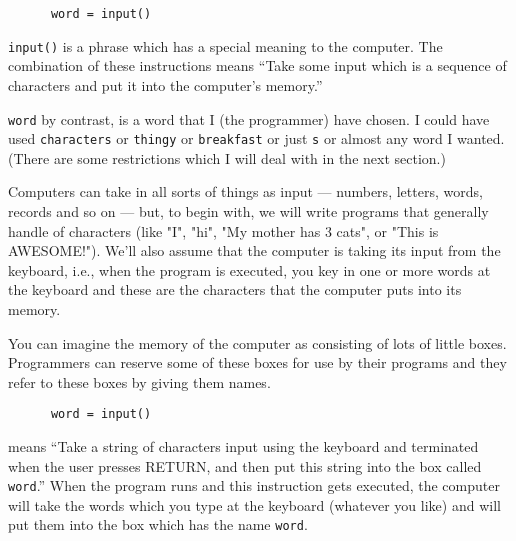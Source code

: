 \begin{Verbatim}
      word = input()
\end{Verbatim}

\verb!input()!
is a phrase which has a special meaning to
the computer. The combination of these instructions
means
``Take some input which is a sequence of characters and put it into the computer's memory.''

\verb!word! by contrast, is a word that I (the programmer) have chosen.
I could have used \verb!characters! or \verb!thingy! or \verb!breakfast!
or just \verb!s! or almost any word I wanted. (There are some
restrictions which I will deal with in the next section.)  

Computers can take in all sorts of things as input --- numbers,
letters, words, records and so on --- but, to begin with, we will
write programs that generally handle
 of characters (like
"I", "hi", "My mother has 3 cats", or "This is AWESOME!").
We'll also assume that the computer is taking its input from the
keyboard, i.e., when the program is executed, you key in one or more
words at the keyboard and these are the characters that the computer 
puts into its memory.

You can imagine the memory of the computer as consisting of lots of
little boxes.  Programmers can reserve some of these boxes for
use by their programs and they refer to these boxes by giving
them names.  

\begin{Verbatim}
      word = input()
\end{Verbatim}

means ``Take a string of characters input using the keyboard and
terminated when the user presses RETURN, and
then put this string into the box called \verb!word!.''  When the program runs and
this instruction gets executed, the computer will take the words which
you type at the keyboard (whatever you like) and will put them into
the box which has the name \verb!word!.

